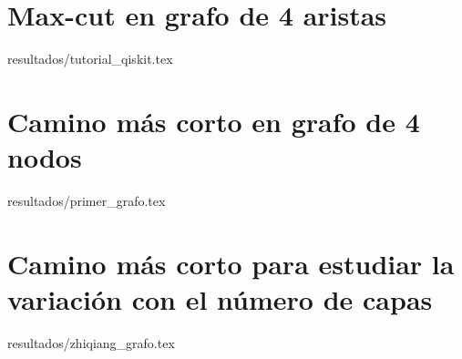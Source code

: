 \section{Max-cut en grafo de 4 aristas}{resultados/tutorial_qiskit.tex}

\section{Camino más corto en grafo de 4 nodos\label{sec:5-primer_grafo}}{resultados/primer_grafo.tex}

\section{Camino más corto para estudiar la variación con el número de capas}{resultados/zhiqiang_grafo.tex}

